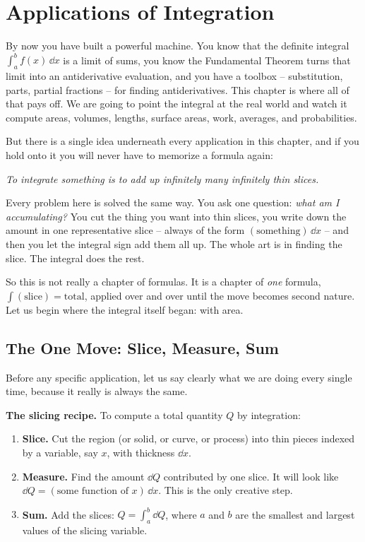 \chapter{Applications of Integration}

By now you have built a powerful machine. You know that the definite integral
$\int_a^b f(x)\,\dd x$ is a limit of sums, you know the Fundamental Theorem turns
that limit into an antiderivative evaluation, and you have a toolbox --
substitution, parts, partial fractions -- for finding antiderivatives. This
chapter is where all of that pays off. We are going to point the integral at the
real world and watch it compute areas, volumes, lengths, surface areas, work,
averages, and probabilities.

But there is a single idea underneath every application in this chapter, and if
you hold onto it you will never have to memorize a formula again:

\begin{center}
\emph{To integrate something is to add up infinitely many infinitely thin slices.}
\end{center}

Every problem here is solved the same way. You ask one question: \emph{what am I
accumulating?} You cut the thing you want into thin slices, you write down the
amount in one representative slice -- always of the form
$(\text{something})\,\dd x$ -- and then you let the integral sign add them all up.
The whole art is in finding the slice. The integral does the rest.

So this is not really a chapter of formulas. It is a chapter of \emph{one}
formula, $\int (\text{slice}) = \text{total}$, applied over and over until the
move becomes second nature. Let us begin where the integral itself began: with
area.

\chapterline

\section{The One Move: Slice, Measure, Sum}
\label{ch26:onemove}

Before any specific application, let us say clearly what we are doing every
single time, because it really is always the same.

\begin{focusbox}
\textbf{The slicing recipe.} To compute a total quantity $Q$ by integration:
\begin{enumerate}
  \item \textbf{Slice.} Cut the region (or solid, or curve, or process) into
  thin pieces indexed by a variable, say $x$, with thickness $\dd x$.
  \item \textbf{Measure.} Find the amount $\dd Q$ contributed by one slice. It
  will look like $\dd Q = (\text{some function of }x)\,\dd x$. This is the only
  creative step.
  \item \textbf{Sum.} Add the slices: $Q = \int_a^b \dd Q$, where $a$ and $b$
  are the smallest and largest values of the slicing variable.
\end{enumerate}
\end{focusbox}

